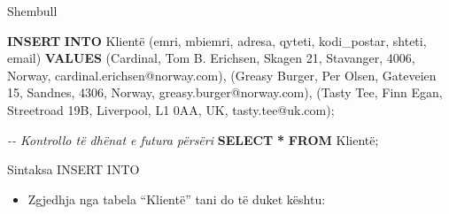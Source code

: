 \documentclass[
  ignorenonframetext,
]{beamer}
\newenvironment{Shaded}{\begin{snugshade}}{\end{snugshade}}
\newcommand{\CommentTok}[1]{\textcolor[rgb]{0.56,0.35,0.01}{\textit{#1}}}
\newcommand{\KeywordTok}[1]{\textcolor[rgb]{0.13,0.29,0.53}{\textbf{#1}}}
\newcommand{\NormalTok}[1]{#1}
\newcommand{\OperatorTok}[1]{\textcolor[rgb]{0.81,0.36,0.00}{\textbf{#1}}}
\newcommand{\StringTok}[1]{\textcolor[rgb]{0.31,0.60,0.02}{#1}}
\providecommand{\tightlist}{%
  \setlength{\itemsep}{0pt}\setlength{\parskip}{0pt}}
\begin{document}
\begin{frame}[fragile]{Shembull}
\label{shembull-6}

\begin{Shaded}
\begin{Highlighting}[]
\KeywordTok{INSERT} \KeywordTok{INTO}\NormalTok{ Klientë (emri, mbiemri, adresa, qyteti, kodi\_postar, shteti, email)}
\KeywordTok{VALUES}
\NormalTok{(}\StringTok{\textquotesingle{}Cardinal\textquotesingle{}}\NormalTok{, }\StringTok{\textquotesingle{}Tom B. Erichsen\textquotesingle{}}\NormalTok{, }\StringTok{\textquotesingle{}Skagen 21\textquotesingle{}}\NormalTok{, }\StringTok{\textquotesingle{}Stavanger\textquotesingle{}}\NormalTok{, }\StringTok{\textquotesingle{}4006\textquotesingle{}}\NormalTok{, }\StringTok{\textquotesingle{}Norway\textquotesingle{}}\NormalTok{, }\StringTok{\textquotesingle{}cardinal.erichsen@norway.com\textquotesingle{}}\NormalTok{),}
\NormalTok{(}\StringTok{\textquotesingle{}Greasy Burger\textquotesingle{}}\NormalTok{, }\StringTok{\textquotesingle{}Per Olsen\textquotesingle{}}\NormalTok{, }\StringTok{\textquotesingle{}Gateveien 15\textquotesingle{}}\NormalTok{, }\StringTok{\textquotesingle{}Sandnes\textquotesingle{}}\NormalTok{, }\StringTok{\textquotesingle{}4306\textquotesingle{}}\NormalTok{, }\StringTok{\textquotesingle{}Norway\textquotesingle{}}\NormalTok{, }\StringTok{\textquotesingle{}greasy.burger@norway.com\textquotesingle{}}\NormalTok{),}
\NormalTok{(}\StringTok{\textquotesingle{}Tasty Tee\textquotesingle{}}\NormalTok{, }\StringTok{\textquotesingle{}Finn Egan\textquotesingle{}}\NormalTok{, }\StringTok{\textquotesingle{}Streetroad 19B\textquotesingle{}}\NormalTok{, }\StringTok{\textquotesingle{}Liverpool\textquotesingle{}}\NormalTok{, }\StringTok{\textquotesingle{}L1 0AA\textquotesingle{}}\NormalTok{, }\StringTok{\textquotesingle{}UK\textquotesingle{}}\NormalTok{, }\StringTok{\textquotesingle{}tasty.tee@uk.com\textquotesingle{}}\NormalTok{);}

\CommentTok{{-}{-} Kontrollo të dhënat e futura përsëri}
\KeywordTok{SELECT} \OperatorTok{*} \KeywordTok{FROM}\NormalTok{ Klientë;}
\end{Highlighting}
\end{Shaded}
\end{frame}

\begin{frame}{Sintaksa INSERT INTO}
\label{sintaksa-insert-into-5}
\begin{itemize}
\tightlist
\item
  Zgjedhja nga tabela ``Klientë'' tani do të duket kështu:
\end{itemize}
\end{frame}
\end{document}
